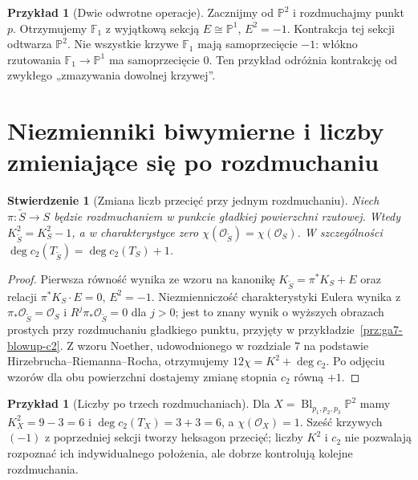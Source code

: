 \documentclass[11pt,a4paper,openany]{report}
\numberwithin{equation}{section}
\theoremstyle{plain}
\newtheorem{stwierdzenie}[twierdzenie]{Stwierdzenie}
\theoremstyle{definition}
\newtheorem{przyklad}[twierdzenie]{Przykład}
\theoremstyle{remark}
\newcommand{\PP}{\mathbb P}
\begin{document}
\begin{przyklad}[Dwie odwrotne operacje]
Zacznijmy od $\PP^2$ i rozdmuchajmy punkt $p$.
Otrzymujemy $\mathbb F_1$ z wyjątkową sekcją
$E\cong\PP^1$, $E^2=-1$. Kontrakcja tej sekcji
odtwarza $\PP^2$. Nie wszystkie krzywe $\mathbb F_1$
mają samoprzecięcie $-1$: włókno rzutowania
$\mathbb F_1\to\PP^1$ ma samoprzecięcie $0$.
Ten przykład odróżnia kontrakcję od zwykłego
„zmazywania dowolnej krzywej”.
\end{przyklad}

\section{Niezmienniki biwymierne i liczby zmieniające się po rozdmuchaniu}
\label{sec:ga8-invariants}

\begin{stwierdzenie}[Zmiana liczb przecięć przy jednym rozdmuchaniu]
\label{st:ga8-classes-blowup}
Niech $\pi:\widetilde S\to S$ będzie rozdmuchaniem
w punkcie gładkiej powierzchni rzutowej. Wtedy
$K_{\widetilde S}^2=K_S^2-1$, a w charakterystyce zero
$\chi(\mathcal O_{\widetilde S})=\chi(\mathcal O_S)$.
W szczególności $\deg c_2(T_{\widetilde S})=
\deg c_2(T_S)+1$.
\end{stwierdzenie}
\begin{proof}
Pierwsza równość wynika ze wzoru na kanonikę
$K_{\widetilde S}=\pi^*K_S+E$ oraz relacji
$\pi^*K_S\cdot E=0$, $E^2=-1$.
Niezmienniczość charakterystyki Eulera wynika z
$\pi_*\mathcal O_{\widetilde S}=\mathcal O_S$
i $R^j\pi_*\mathcal O_{\widetilde S}=0$ dla $j>0$;
jest to znany wynik o wyższych obrazach prostych przy
rozdmuchaniu gładkiego punktu, przyjęty w
przykładzie~\ref{prz:ga7-blowup-c2}.
Z wzoru Noether, udowodnionego w rozdziale 7
na podstawie Hirzebrucha--Riemanna--Rocha,
otrzymujemy $12\chi=K^2+\deg c_2$.
Po odjęciu wzorów dla obu powierzchni dostajemy
zmianę stopnia $c_2$ równą $+1$.
\end{proof}

\begin{przyklad}[Liczby po trzech rozdmuchaniach]
Dla $X=\operatorname{Bl}_{p_1,p_2,p_3}\PP^2$
mamy $K_X^2=9-3=6$ i $\deg c_2(T_X)=3+3=6$,
a $\chi(\mathcal O_X)=1$. Sześć krzywych $(-1)$
z poprzedniej sekcji tworzy heksagon przecięć;
liczby $K^2$ i $c_2$ nie pozwalają rozpoznać
ich indywidualnego położenia, ale dobrze
kontrolują kolejne rozdmuchania.
\end{przyklad}
\end{document}
